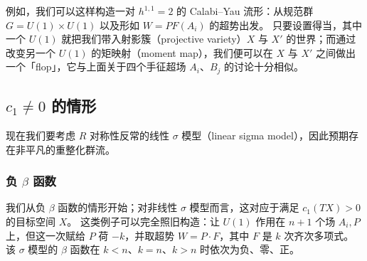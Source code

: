 

例如，我们可以这样构造一对 $h^{1,1}=2$ 的 Calabi--Yau 流形：从规范群 $G=U(1)\times U(1)$ 以及形如 $W=PF(A_i)$ 的超势出发。
只要设置得当，其中一个 $U(1)$ 就把我们带入射影簇（projective variety）$X$ 与 $X'$ 的世界；而通过改变另一个 $U(1)$ 的矩映射（moment map），我们便可以在 $X$ 与 $X'$ 之间做出一个「flop」，它与上面关于四个手征超场 $A_i$、$B_j$ 的讨论十分相似。


\subsection{$c_1\ne0$ 的情形}

现在我们要考虑 $R$ 对称性反常的线性 $\sigma$ 模型（linear sigma model），因此预期存在非平凡的重整化群流。

\subsubsection{负 $\beta$ 函数}

我们从负 $\beta$ 函数的情形开始；对非线性 $\sigma$ 模型而言，这对应于满足 $c_1(TX)>0$ 的目标空间 $X$。
这类例子可以完全照旧构造：让 $U(1)$ 作用在 $n+1$ 个场 $A_i,P$ 上，但这一次赋给 $P$ 荷 $-k$，并取超势 $W=P\cdot F$，其中 $F$ 是 $k$ 次齐次多项式。
该 $\sigma$ 模型的 $\beta$ 函数在 $k<n$、$k=n$、$k>n$ 时依次为负、零、正。

